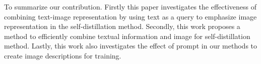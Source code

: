 To summarize our contribution. Firstly this paper investigates the effectiveness of combining text-image representation by using text as a query to emphasize image representation in the self-distillation method. Secondly, this work proposes a method to efficiently combine textual information and image for self-distillation method. Lastly, this work also investigates the effect of prompt in our methods to create image descriptions for training. 





